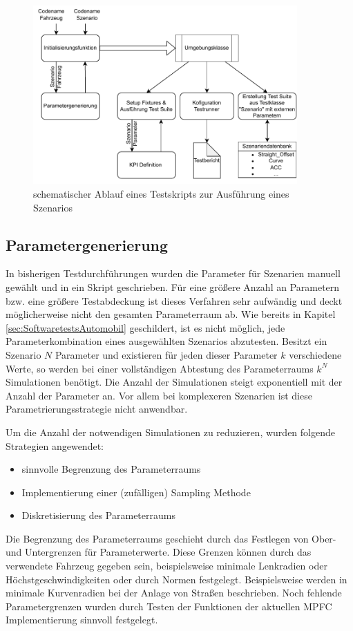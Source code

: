 \begin{figure}[ht]
    \centering
    \includegraphics[width=0.9\textwidth]{figures/3_Implementierung/Ablauf_TestSkript.drawio.pdf}
    \caption{schematischer Ablauf eines Testskripts zur Ausführung eines Szenarios}
    \label{fig:Testskript_Ablauf}
\end{figure}

\subsection{Parametergenerierung} \label{subsec:Parametergenerierung}
In bisherigen Testdurchführungen wurden die Parameter für Szenarien manuell gewählt und in ein Skript geschrieben. Für eine größere Anzahl an Parametern bzw. eine größere Testabdeckung ist dieses Verfahren sehr aufwändig und deckt möglicherweise nicht den gesamten Parameterraum ab. Wie bereits in Kapitel \ref{sec:SoftwaretestsAutomobil} geschildert, ist es nicht möglich, jede Parameterkombination eines ausgewählten Szenarios abzutesten. Besitzt ein Szenario $N$ Parameter und existieren für jeden dieser Parameter $k$ verschiedene Werte, so werden bei einer vollständigen Abtestung des Parameterraums $k^{N}$ Simulationen benötigt. Die Anzahl der Simulationen steigt exponentiell mit der Anzahl der Parameter an. Vor allem bei komplexeren Szenarien ist diese Parametrierungsstrategie nicht anwendbar.

Um die Anzahl der notwendigen Simulationen zu reduzieren, wurden folgende Strategien angewendet:
\begin{itemize}
    \item sinnvolle Begrenzung des Parameterraums
    \item Implementierung einer (zufälligen) Sampling Methode
    \item Diskretisierung des Parameterraums
\end{itemize}
Die Begrenzung des Parameterraums geschieht durch das Festlegen von Ober- und Untergrenzen für Parameterwerte. Diese Grenzen können durch das verwendete Fahrzeug gegeben sein, beispielsweise minimale Lenkradien oder Höchstgeschwindigkeiten oder durch Normen festgelegt. Beispielsweise werden in \cite{Bau2019} minimale Kurvenradien bei der Anlage von Straßen beschrieben. Noch fehlende Parametergrenzen wurden durch Testen der Funktionen der aktuellen MPFC Implementierung sinnvoll festgelegt.

